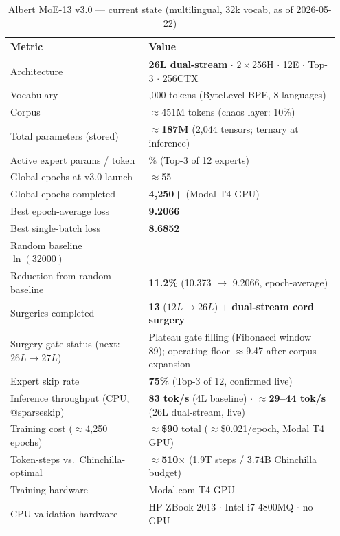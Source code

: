 \documentclass[11pt,a4paper]{article}
\begin{document}
\begin{table}[htbp]
\centering
\small
\caption{Albert MoE-13 v3.0 --- current state (multilingual, 32k vocab, as of 2026-05-22)}
\label{tab:albert_v3}
\begin{tabular}{@{}>{\raggedright\arraybackslash}p{0.40\linewidth} >{\raggedright\arraybackslash}p{0.55\linewidth}@{}}
\toprule
Metric & Value \\
\midrule
Architecture & \textbf{26L dual-stream} $\cdot$ $2{\times}$256H $\cdot$ 12E $\cdot$ Top-3 $\cdot$ 256CTX \\
Vocabulary & 32,000 tokens (ByteLevel BPE, 8 languages) \\
Corpus & $\approx$451M tokens (chaos layer: 10\%) \\
Total parameters (stored) & $\approx$\textbf{187M} (2{,}044 tensors; ternary at inference) \\
Active expert params / token & 25\% (Top-3 of 12 experts) \\
Global epochs at v3.0 launch & $\approx$55 \\
Global epochs completed & \textbf{4{,}250+} (Modal T4 GPU) \\
Best epoch-average loss & \textbf{9.2066} \\
Best single-batch loss & \textbf{8.6852} \\
Random baseline $\ln(32000)$ & 10.373 \\
Reduction from random baseline & \textbf{11.2\%} (10.373 $\to$ 9.2066, epoch-average) \\
Surgeries completed & \textbf{13} ($12L \to 26L$) $+$ \textbf{dual-stream cord surgery} \\
Surgery gate status (next: $26L \to 27L$) & Plateau gate filling (Fibonacci window 89); operating floor $\approx$9.47 after corpus expansion \\
Expert skip rate & \textbf{75\%} (Top-3 of 12, confirmed live) \\
Inference throughput (CPU, @sparseskip) & \textbf{83 tok/s} (4L baseline) $\cdot$ \textbf{$\approx$29--44 tok/s} (26L dual-stream, live) \\
Training cost ($\approx$4{,}250 epochs) & $\approx$\textbf{\$90} total ($\approx$\$0.021/epoch, Modal T4 GPU) \\
Token-steps vs.\ Chinchilla-optimal & \textbf{$\approx$510$\times$} (1.9T steps / 3.74B Chinchilla budget) \\
Training hardware & Modal.com T4 GPU \\
CPU validation hardware & HP ZBook 2013 $\cdot$ Intel i7-4800MQ $\cdot$ no GPU \\
\bottomrule
\end{tabular}
\end{table}
\end{document}
